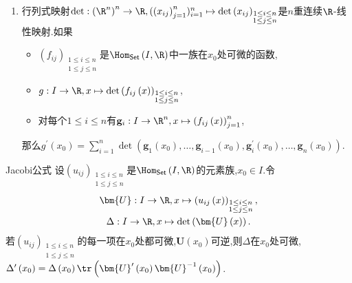 \begin{example}{}{}
\begin{enumerate}
		特别地,如果$n\geq 1$,$\left(\alpha_{ij}\right)_{\substack{1\leq i\leq n\\ 1\leq j\leq n}}$和$\left(\beta_{ij}\right)_{\substack{1\leq i\leq n\\ 1\leq j\leq n}}$是$\Hom_{\mathsf{Set}}\left(I,\R\right)$中的$n$阶方阵,
		\begin{align*}
			\bm{A}:I\to\R,x\mapsto\left(\alpha_{ij}\left(x\right)\right)_{\substack{1\leq i\leq n\\ 1\leq j\leq n}},\\
			\bm{B}:I\to\R,x\mapsto\left(\beta_{ij}\left(x\right)\right)_{\substack{1\leq i\leq n\\ 1\leq j\leq n}},
		\end{align*}
		并且二者在$x_{0}$处可微,那么$\bm{A}\bm{B}$在$x_{0}$处可微,其导数为$\bm{A}^{\prime}\left(x_{0}\right)\bm{B}\left(x_{0}\right)+\bm{A}\left(x_{0}\right)\bm{B}^{\prime}\left(x_{0}\right)$.
		\item 行列式映射$\det:\left(\R^{n}\right)^{n}\to\R,(\left(x_{ij}\right)_{j=1}^{n})_{i=1}^{n}\mapsto\det\left(x_{ij}\right)_{\substack{1\leq i\leq n\\ 1\leq j\leq n}}$是$n$重连续$\R$-线性映射.如果
		\begin{itemize}
			\item $\left(f_{ij}\right)_{\substack{1\leq i\leq n\\ 1\leq j\leq n}}$是$\Hom_{\mathsf{Set}}\left(I,\R\right)$中一族在$x_{0}$处可微的函数,
			\item $g:I\to\R,x\mapsto\det\left(f_{ij}\left(x\right)\right)_{\substack{1\leq i\leq n\\ 1\leq j\leq n}}$,
			\item 对每个$1\leq i\leq n$有$\mathbf{g}_{i}:I\to\R^{n},x\mapsto\left(f_{ij}\left(x\right)\right)_{j=1}^{n}$,
		\end{itemize}
		那么$g^{\prime}\left(x_{0}\right)=\sum\limits_{i=1}^{n}\det\left(\mathbf{g}_{1}\left(x_{0}\right),\ldots,\mathbf{g}_{i-1}\left(x_{0}\right),\mathbf{g}_{i}^{\prime}\left(x_{0}\right),\ldots,\mathbf{g}_{n}\left(x_{0}\right)\right)$.
	\end{enumerate}
\end{example}

\begin{proposition}{Jacobi公式}{}
	设$\left(u_{ij}\right)_{\substack{1\leq i\leq n\\ 1\leq j\leq n}}$是$\Hom_{\mathsf{Set}}\left(I,\R\right)$的元素族,$x_{0}\in I$.令
	\begin{gather*}
		\bm{U}:I\to\R,x\mapsto\left(u_{ij}\left(x\right)\right)_{\substack{1\leq i\leq n\\ 1\leq j\leq n}},\\
		\Delta:I\to\R,x\mapsto\det\left(\bm{U}\left(x\right)\right).
	\end{gather*}
	若$\left(u_{ij}\right)_{\substack{1\leq i\leq n\\ 1\leq j\leq n}}$的每一项在$x_{0}$处都可微,$\bm{U}\left(x_{0}\right)$可逆,则$\Delta$在$x_{0}$处可微,$\Delta^{\prime}\left(x_{0}\right)=\Delta\left(x_{0}\right)\tr\left(\bm{U}^{\prime}\left(x_{0}\right)\bm{U}^{-1}\left(x_{0}\right)\right)$.
\end{proposition}


